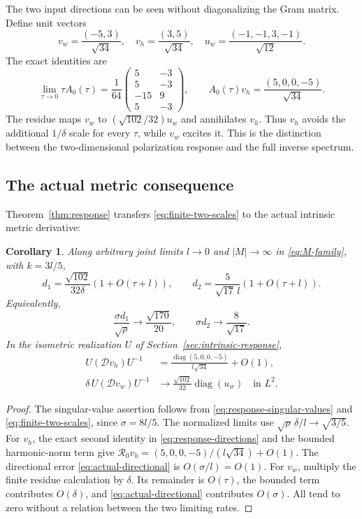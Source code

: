 \documentclass[11pt]{amsart}
\newtheorem{corollary}[theorem]{Corollary}
\theoremstyle{definition}
\theoremstyle{remark}
\newcommand{\diag}{\operatorname{diag}}
\newcommand{\cR}{\mathcal R}
\newcommand{\cD}{\mathscr D}
\begin{document}
The two input directions can be seen without diagonalizing the Gram
matrix. Define unit vectors
\[
 v_w=\frac{(-5,3)}{\sqrt{34}},\quad
 v_h=\frac{(3,5)}{\sqrt{34}},\quad
 u_w=\frac{(-1,-1,3,-1)}{\sqrt{12}}.
\]
The exact identities are
\begin{equation}\label{eq:response-directions}
 \lim_{\tau\to0}\tau A_0(\tau)
 =\frac1{64}\begin{pmatrix}5&-3\\5&-3\\-15&9\\5&-3\end{pmatrix},
 \qquad
 A_0(\tau)v_h=\frac{(5,0,0,-5)}{\sqrt{34}}.
\end{equation}
The residue maps $v_w$ to $(\sqrt{102}/32)u_w$ and annihilates $v_h$.
Thus $v_h$ avoids the additional $1/\delta$ scale for every $\tau$,
while $v_w$ excites it. This is the distinction between the two-dimensional
polarization response and the full inverse spectrum.

\subsection{The actual metric consequence}
Theorem~\ref{thm:response} transfers \eqref{eq:finite-two-scales} to the
actual intrinsic metric derivative:
\begin{corollary}\label{cor:actual-two-scales}
Along arbitrary joint limits $l\to0$ and $|M|\to\infty$ in
\eqref{eq:M-family}, with $k=3l/5$,
\begin{equation}\label{eq:actual-two-scales}
 d_1=\frac{\sqrt{102}}{32\delta}(1+O(\tau+l)),\qquad
 d_2=\frac5{\sqrt{17}\,l}(1+O(\tau+l)).
\end{equation}
Equivalently,
\[
 \frac{\sigma d_1}{\sqrt\rho}\longrightarrow\frac{\sqrt{170}}{20},
 \qquad \sigma d_2\longrightarrow\frac8{\sqrt{17}}.
\]
In the isometric realization $U$ of Section~\ref{sec:intrinsic-response},
\begin{align}
 U(\cD v_h)U^{-1}
 &=\frac{\diag(5,0,0,-5)}{l\sqrt{34}}+O(1),
       \label{eq:actual-hard-direction}\\
 \delta\,U(\cD v_w)U^{-1}
 &\longrightarrow\frac{\sqrt{102}}{32}\diag(u_w)
       \quad\text{in }L^2.\label{eq:actual-weak-direction}
\end{align}
\end{corollary}

\begin{proof}
The singular-value assertion follows from
\eqref{eq:response-singular-values} and \eqref{eq:finite-two-scales},
since $\sigma=8l/5$. The normalized limits use
$\sqrt\rho\,\delta/l\to\sqrt{3/5}$. For $v_h$, the exact second
identity in \eqref{eq:response-directions} and the bounded harmonic-norm
term give $\cR_0v_h=(5,0,0,-5)/(l\sqrt{34})+O(1)$.
The directional error \eqref{eq:actual-directional} is $O(\sigma/l)=O(1)$.
For $v_w$, multiply the finite residue calculation by $\delta$.
Its remainder is $O(\tau)$, the bounded term contributes $O(\delta)$,
and \eqref{eq:actual-directional} contributes $O(\sigma)$.
All tend to zero without a relation between the two limiting rates.
\end{proof}
\end{document}
